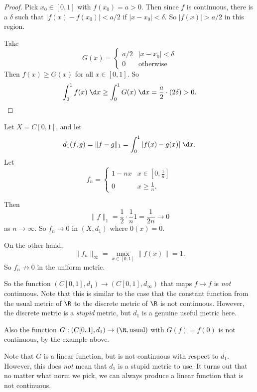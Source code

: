\documentclass[a4paper]{article}
\begin{document}
\begin{proof}
  Pick $x_0 \in [0, 1]$ with $f(x_0) = a > 0$. Then since $f$ is continuous, there is a $\delta$ such that $|f(x) - f(x_0)| < a/2$ if $|x - x_0| < \delta$. So $|f(x)| > a/2$ in this region.

  Take
  \[
    G(x) = 
    \begin{cases}
      a/2 & |x - x_0| < \delta\\
      0 & \text{otherwise}
    \end{cases}
  \]
  Then $f(x) \geq G(x)$ for all $x\in [0, 1]$. So 
  \[
    \int_0^1 f(x)\;\d x \geq \int_0^1 G(x)\;\d x = \frac{a}{2}\cdot (2\delta) > 0.
  \]
\end{proof}

\begin{eg}
  Let $X = C[0, 1]$, and let
  \[
    d_1(f, g) = \|f - g\|_1 = \int_0^1 |f(x) - g(x)|\;\d x.
  \]
  Let 
  \[
    f_n = 
    \begin{cases}
      1 - nx & x \in [0, \frac{1}{n}]\\
      0 & x \geq \frac{1}{n}.
    \end{cases}
  \]
  \begin{center}
  \end{center}
  Then
  \[
    \|f\|_1 = \frac{1}{2}\cdot \frac{1}{n} 1 = \frac{1}{2n} \to 0
  \]
  as $n \to \infty$. So $f_n \to 0$ in $(X, d_1)$ where $0(x) = 0$.

  On the other hand,
  \[
    \|f_n\|_\infty = \max_{x\in [0, 1]} \|f(x)\| = 1.
  \]
  So $f_n \not\to 0$ in the uniform metric.

  So the function $(C[0, 1], d_1) \to (C[0, 1], d_\infty)$ that maps $f\mapsto f$ is \emph{not} continuous. Note that this is similar to the case that the constant function from the usual metric of $\R$ to the discrete metric of $\R$ is not continuous. However, the discrete metric is a \emph{stupid} metric, but $d_1 $ is a genuine useful metric here.

  Also the function $G: (C[0, 1], d_1) \to (\R, \text{usual})$ with $G(f) = f(0)$ is not continuous, by the example above.
\end{eg}
Note that $G$ is a linear function, but is not continuous with respect to $d_1$. However, this does \emph{not} mean that $d_1$ is a stupid metric to use. It turns out that no matter what norm we pick, we can always produce a linear function that is not continuous.
\end{document}
